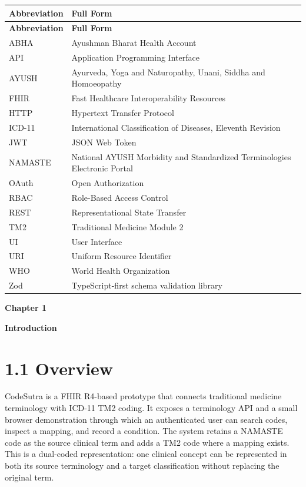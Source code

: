 \documentclass[12pt,a4paper,oneside]{report}
\begin{document}
\begin{longtable}{|p{}|p{}|}
\hline
\textbf{Abbreviation} & \textbf{Full Form} \\ \hline
\endfirsthead
\hline \textbf{Abbreviation} & \textbf{Full Form} \\ \hline\endhead
ABHA & Ayushman Bharat Health Account \\ \hline
API & Application Programming Interface \\ \hline
AYUSH & Ayurveda, Yoga and Naturopathy, Unani, Siddha and Homoeopathy \\ \hline
FHIR & Fast Healthcare Interoperability Resources \\ \hline
HTTP & Hypertext Transfer Protocol \\ \hline
ICD-11 & International Classification of Diseases, Eleventh Revision \\ \hline
JWT & JSON Web Token \\ \hline
NAMASTE & National AYUSH Morbidity and Standardized Terminologies Electronic Portal \\ \hline
OAuth & Open Authorization \\ \hline
RBAC & Role-Based Access Control \\ \hline
REST & Representational State Transfer \\ \hline
TM2 & Traditional Medicine Module 2 \\ \hline
UI & User Interface \\ \hline
URI & Uniform Resource Identifier \\ \hline
WHO & World Health Organization \\ \hline
Zod & TypeScript-first schema validation library \\ \hline
\end{longtable}
\vspace{4pt}
\clearpage
\clearpage\begin{center}\Large\textbf{Chapter 1}\end{center}
\begin{center}\LARGE\textbf{\textbf{Introduction}}\end{center}\vspace{8pt}
\section*{1.1 Overview}
CodeSutra is a FHIR R4-based prototype that connects traditional medicine terminology with ICD-11 TM2 coding. It exposes a terminology API and a small browser demonstration through which an authenticated user can search codes, inspect a mapping, and record a condition. The system retains a NAMASTE code as the source clinical term and adds a TM2 code where a mapping exists. This is a dual-coded representation: one clinical concept can be represented in both its source terminology and a target classification without replacing the original term.
\end{document}

